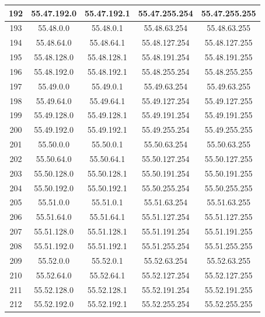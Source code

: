 \documentclass[letterpaper,12pt]{article}
\begin{document}
\begin{center}
\begin{longtable}{|c|c|c|c|c|}
                192 & 55.47.192.0 & 55.47.192.1 & 55.47.255.254 & 55.47.255.255 \\ \hline
                193 & 55.48.0.0 & 55.48.0.1 & 55.48.63.254 & 55.48.63.255 \\ \hline
                194 & 55.48.64.0 & 55.48.64.1 & 55.48.127.254 & 55.48.127.255 \\ \hline
                195 & 55.48.128.0 & 55.48.128.1 & 55.48.191.254 & 55.48.191.255 \\ \hline
                196 & 55.48.192.0 & 55.48.192.1 & 55.48.255.254 & 55.48.255.255 \\ \hline
                197 & 55.49.0.0 & 55.49.0.1 & 55.49.63.254 & 55.49.63.255 \\ \hline
                198 & 55.49.64.0 & 55.49.64.1 & 55.49.127.254 & 55.49.127.255 \\ \hline
                199 & 55.49.128.0 & 55.49.128.1 & 55.49.191.254 & 55.49.191.255 \\ \hline
                200 & 55.49.192.0 & 55.49.192.1 & 55.49.255.254 & 55.49.255.255 \\ \hline
                201 & 55.50.0.0 & 55.50.0.1 & 55.50.63.254 & 55.50.63.255 \\ \hline
                202 & 55.50.64.0 & 55.50.64.1 & 55.50.127.254 & 55.50.127.255 \\ \hline
                203 & 55.50.128.0 & 55.50.128.1 & 55.50.191.254 & 55.50.191.255 \\ \hline
                204 & 55.50.192.0 & 55.50.192.1 & 55.50.255.254 & 55.50.255.255 \\ \hline
                205 & 55.51.0.0 & 55.51.0.1 & 55.51.63.254 & 55.51.63.255 \\ \hline
                206 & 55.51.64.0 & 55.51.64.1 & 55.51.127.254 & 55.51.127.255 \\ \hline
                207 & 55.51.128.0 & 55.51.128.1 & 55.51.191.254 & 55.51.191.255 \\ \hline
                208 & 55.51.192.0 & 55.51.192.1 & 55.51.255.254 & 55.51.255.255 \\ \hline
                209 & 55.52.0.0 & 55.52.0.1 & 55.52.63.254 & 55.52.63.255 \\ \hline
                210 & 55.52.64.0 & 55.52.64.1 & 55.52.127.254 & 55.52.127.255 \\ \hline
                211 & 55.52.128.0 & 55.52.128.1 & 55.52.191.254 & 55.52.191.255 \\ \hline
                212 & 55.52.192.0 & 55.52.192.1 & 55.52.255.254 & 55.52.255.255 \\ \hline

\end{longtable}
\end{center}
\end{document}
